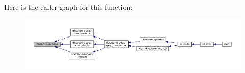 Here is the caller graph for this function\+:\nopagebreak
\begin{figure}[H]
\begin{center}
\leavevmode
\includegraphics[width=350pt]{namespacemortality_aae8b4072e1f5c7c59cc76370de99d271_icgraph}
\end{center}
\end{figure}


